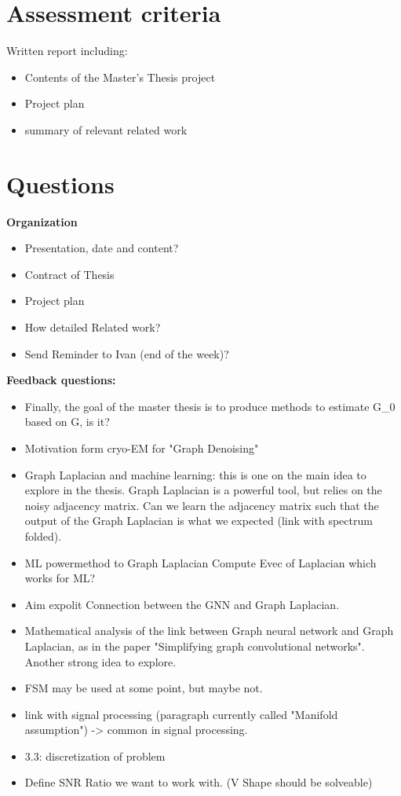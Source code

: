 \chapter{Assessment criteria}
Written report including: 
\begin{itemize}
    \item Contents of the Master's Thesis project
    \item Project plan
    \item summary of relevant related work
\end{itemize}

\chapter{Questions}


\textbf{Organization}
\begin{itemize}
    \item Presentation, date and content?
    \item Contract of Thesis
    \item Project plan
    \item How detailed Related work?
    \item Send Reminder to Ivan (end of the week)?
\end{itemize}

\textbf{Feedback questions:}
\begin{itemize}
    \item Finally, the goal of the master thesis is to produce methods to estimate G_0 based on G, is it?
    \item Motivation form cryo-EM for "Graph Denoising"
    
    
    \item Graph Laplacian and machine learning: this is one on the main idea to explore in the thesis. 
        Graph Laplacian is a powerful tool, but relies on the noisy adjacency matrix. 
        Can we learn the adjacency matrix such that the output of the Graph Laplacian is what we expected (link with spectrum folded).
    \item ML powermethod to Graph Laplacian
        Compute Evec of Laplacian which works for ML?
    \item Aim expolit Connection between the GNN and Graph Laplacian.
    \item Mathematical analysis of the link between Graph neural network and Graph Laplacian, as in the paper "Simplifying graph convolutional networks". Another strong idea to explore.
    \item FSM may be used at some point, but maybe not.
    \item link with signal processing (paragraph currently called "Manifold assumption") -> common in signal processing.
    \item 3.3: discretization of problem
    \item Define SNR Ratio we want to work with. (V Shape should be solveable)

\end{itemize}
